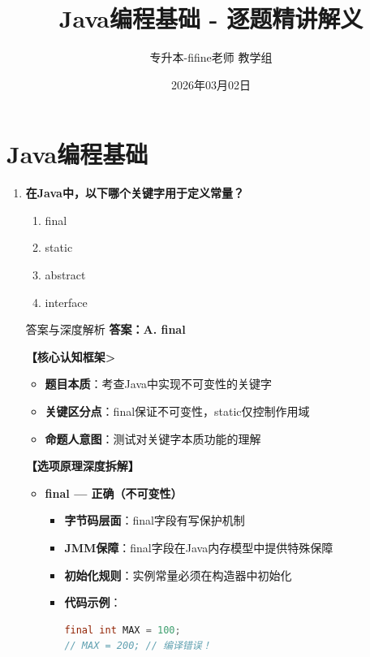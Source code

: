 \documentclass[12pt, a4paper]{ctexart}
\title{\textcolor{myblue}{\textbf{Java编程基础 - 逐题精讲解义}}}
\author{专升本-fifine老师 教学组}
\date{2026年03月02日}
\begin{document}
\maketitle
\thispagestyle{empty}
\newpage

\section{Java编程基础}

\begin{enumerate}[label=\textbf{\arabic*.}]

	\item \textbf{在Java中，以下哪个关键字用于定义常量？}
	      \begin{enumerate}[label=\Alph*.]
		      \item final
		      \item static
		      \item abstract
		      \item interface
	      \end{enumerate}

	      \begin{bluebox}{答案与深度解析}
		      \textbf{答案：A. final}

		      \textbf{【核心认知框架>}
		      \begin{itemize}[label={}, leftmargin=*, nosep]
			      \item \textbf{题目本质}：考查Java中实现不可变性的关键字
			      \item \textbf{关键区分点}：final保证不可变性，static仅控制作用域
			      \item \textbf{命题人意图}：测试对关键字本质功能的理解
		      \end{itemize}

		      \textbf{【选项原理深度拆解】}

		      \begin{itemize}[leftmargin=*, nosep, label={}]
			      \item[A] \textbf{final — 正确（不可变性）}
			      \begin{itemize}[label={}, leftmargin=*, nosep]
				      \item \textbf{字节码层面}：final字段有写保护机制
				      \item \textbf{JMM保障}：final字段在Java内存模型中提供特殊保障
				      \item \textbf{初始化规则}：实例常量必须在构造器中初始化
				      \item \textbf{代码示例}：
				            \begin{lstlisting}[language=Java]
final int MAX = 100;
// MAX = 200; // 编译错误！
				            \end{lstlisting}
			      \end{itemize}


\end{itemize}
\end{bluebox}
\end{enumerate}
\end{document}
